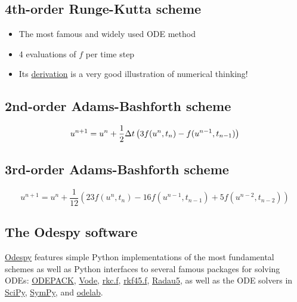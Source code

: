 \documentclass[%
oneside,                 %
final,                   %
10pt]{article}
\begin{document}
\subsection*{4th-order Runge-Kutta scheme}
\label{decay:fd2:RK4}

\begin{itemize}
 \item The most famous and widely used ODE method

 \item 4 evaluations of $f$ per time step

 \item Its \href{{http://tinyurl.com/nclmcng/pub/sphinx-decay/._main_decay007.html#th-order-runge-kutta-scheme}}{derivation} is a very good illustration of numerical thinking!
\end{itemize}

\noindent
\subsection*{2nd-order Adams-Bashforth scheme}


\begin{equation}
u^{n+1} = u^n + \half\Delta t\left( 3f(u^n, t_n) - f(u^{n-1}, t_{n-1})
\right)
\label{decay:fd2:AB2}
\end{equation}

\subsection*{3rd-order Adams-Bashforth scheme}

\begin{equation}
u^{n+1} = u^n + \frac{1}{12}\left( 23f(u^n, t_n) - 16 f(u^{n-1},t_{n-1})
+ 5f(u^{n-2}, t_{n-2})\right)
\label{decay:fd2:AB3}
\end{equation}

\subsection*{The Odespy software}

\href{{https://github.com/hplgit/odespy}}{Odespy}
features simple Python implementations of the most fundamental
schemes as well as Python interfaces to several famous packages for
solving ODEs: \href{{https://computation.llnl.gov/casc/odepack/odepack_home.html}}{ODEPACK},
\href{{https://computation.llnl.gov/casc/odepack/odepack_home.html}}{Vode},
\href{{http://www.netlib.org/ode/rkc.f}}{rkc.f},
\href{{http://www.netlib.org/ode/rkf45.f}}{rkf45.f},
\href{{http://www.unige.ch/~hairer/software.html}}{Radau5}, as well
as the ODE solvers in
\href{{http://docs.scipy.org/doc/scipy/reference/generated/scipy.integrate.ode.html}}{SciPy},
\href{{http://docs.sympy.org/dev/modules/mpmath/calculus/odes.html}}{SymPy}, and
\href{{http://olivierverdier.github.com/odelab/}}{odelab}.
\end{document}
